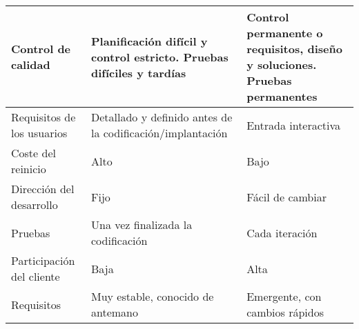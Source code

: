 \begin{longtable}{|p{5cm}|p{5cm}|p{5cm}|}
    Control de calidad                             & Planificación difícil y control estricto. Pruebas difíciles y tardías                                                              & Control permanente o requisitos, diseño y soluciones. Pruebas permanentes                                                                                                                           \\\hline
    Requisitos de los usuarios                     & Detallado y definido antes de la codificación/implantación                                                                         & Entrada interactiva                                                                                                                                                                                 \\\hline
    Coste del reinicio                             & Alto                                                                                                                               & Bajo                                                                                                                                                                                                \\\hline
    Dirección del desarrollo                       & Fijo                                                                                                                               & Fácil de cambiar                                                                                                                                                                                    \\\hline
    Pruebas                                        & Una vez finalizada la codificación                                                                                                 & Cada iteración                                                                                                                                                                                      \\\hline
    Participación del cliente                      & Baja                                                                                                                               & Alta                                                                                                                                                                                                \\\hline
    Requisitos                                     & Muy estable, conocido de antemano                                                                                                  & Emergente, con cambios rápidos                                                                                                                                                                      \\\hline

\end{longtable}
